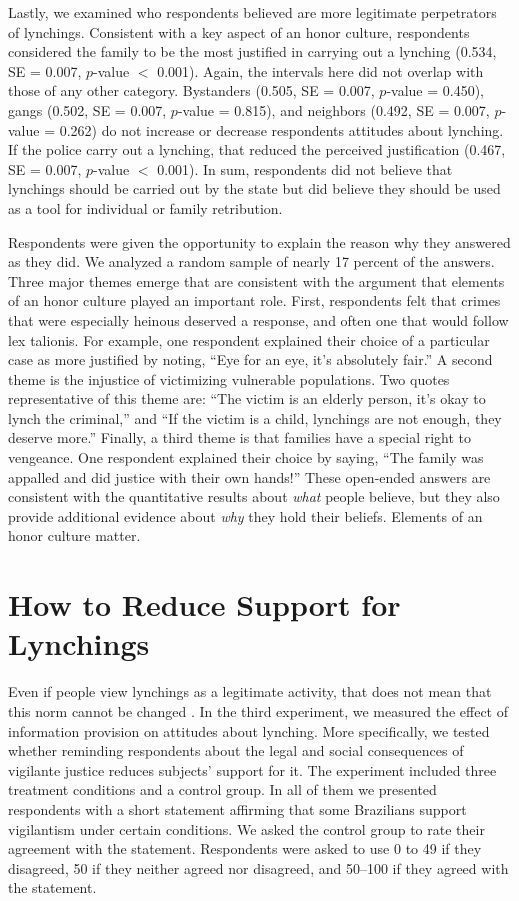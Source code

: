 \documentclass[12pt,a4paper]{article}
\begin{document}
Lastly, we examined who respondents believed are more legitimate perpetrators of lynchings. Consistent with a key aspect of an honor culture, respondents considered the family to be the most justified in carrying out a lynching (0.534, SE = 0.007, $p$-value $<$ 0.001). Again, the intervals here did not overlap with those of any other category. Bystanders (0.505, SE = 0.007, $p$-value = 0.450), gangs (0.502, SE = 0.007, $p$-value = 0.815), and neighbors (0.492, SE = 0.007, $p$-value = 0.262) do not increase or decrease respondents attitudes about lynching. If the police carry out a lynching, that reduced the perceived justification (0.467, SE = 0.007, $p$-value $<$ 0.001). In sum, respondents did not believe that lynchings should be carried out by the state but did believe they should be used as a tool for individual or family retribution.

Respondents were given the opportunity to explain the reason why they answered as they did. We analyzed a random sample of nearly 17 percent of the answers. Three major themes emerge that are consistent with the argument that elements of an honor culture played an important role. First, respondents felt that crimes that were especially heinous deserved a response, and often one that would follow lex talionis. For example, one respondent explained their choice of a particular case as more justified by noting, ``Eye for an eye, it's absolutely fair.'' A second  theme is the injustice of victimizing vulnerable populations. Two quotes representative of this theme are: ``The victim is an elderly person, it's okay to lynch the criminal,'' and ``If the victim is a child, lynchings are not enough, they deserve more.'' Finally, a third theme is that families have a special right to vengeance. One respondent explained their choice by saying, ``The family was appalled and did justice with their own hands!'' These open-ended answers are consistent with the quantitative results about \textit{what} people believe, but they also provide additional evidence about \textit{why} they hold their beliefs. Elements of an honor culture matter. 

\section{How to Reduce Support for Lynchings}
\label{sec:exp03}

Even if people view lynchings as a legitimate activity, that does not mean that this norm cannot be changed \citep{weaver2019judge}. In the third experiment, we measured the effect of information provision on attitudes about lynching. More specifically, we tested whether reminding respondents about the legal and social consequences of vigilante justice reduces subjects' support for it. The experiment included three treatment conditions and a control group. In all of them we presented respondents with a short statement affirming that some Brazilians support vigilantism under certain conditions. We asked the control group to rate their agreement with the statement. Respondents were asked to use 0 to 49 if they disagreed, 50 if they neither agreed nor disagreed, and 50--100 if they agreed with the statement.
\end{document}
